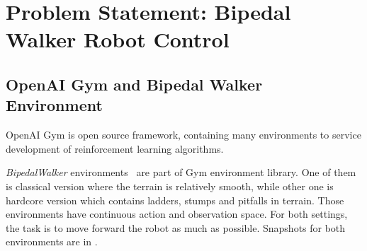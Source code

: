 \section{Problem Statement: Bipedal Walker Robot Control}
\label{sec:problem_statement}

\subsection{OpenAI Gym and Bipedal Walker Environment}
\label{ssec:gym_bipedal}

OpenAI Gym \cite{brockman_openai_2016} is open source framework, 
containing many environments to service development of 
reinforcement learning algorithms. 

\textit{BipedalWalker} environments~\cite{noauthor_bipedalwalker-v2_2021, noauthor_bipedalwalkerhardcore-v2_2021} are part of Gym environment library. 
One of them is classical version where the terrain is relatively smooth, while other one is hardcore version which contains ladders, stumps and pitfalls in terrain. 
Those environments have continuous action and observation space. 
For both settings, the task is to move forward the robot as much as possible. 
Snapshots for both environments are in .
